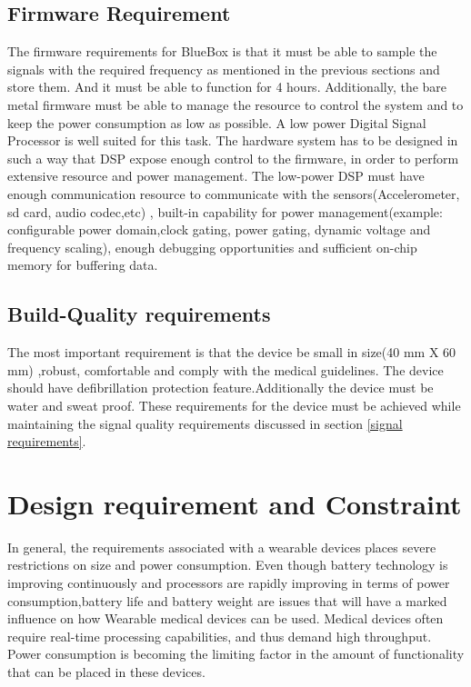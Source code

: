 \subsection{Firmware Requirement }
\hspace{10mm}The firmware requirements for BlueBox  is that it must be able to sample the signals with the required frequency as mentioned in the previous sections and store them. And it must be able to function for 4 hours. Additionally, the bare metal firmware must be able to manage the resource to control the system and to keep the power consumption as low as possible. A low power Digital Signal Processor is well suited for this task. The hardware system has to be designed in such a way that DSP  expose enough control to the firmware, in order to perform extensive resource and power management. The low-power DSP must have enough communication resource to communicate with the sensors(Accelerometer, sd card, audio codec,etc) , built-in capability for power management(example: configurable power domain,clock gating, power gating, dynamic voltage and frequency scaling), enough debugging opportunities and sufficient on-chip memory for buffering data. 

\subsection {Build-Quality requirements} 
\hspace{10mm}The most important requirement is that the device be small in size(40 mm X 60 mm) ,robust, comfortable and comply with the medical guidelines. The device should have defibrillation protection feature.Additionally the device must be water and sweat proof. These requirements for the device must be achieved while maintaining the signal quality requirements discussed in section \ref{signal requirements}.  

\section {Design requirement and Constraint} 
In general, the requirements associated with a wearable devices places severe restrictions on size and power consumption. Even though battery technology is improving continuously and processors are rapidly improving in terms of power consumption,battery life and battery weight are issues that will have a marked influence on how  Wearable medical devices can be used. Medical devices often require real-time processing capabilities, and thus demand high throughput. Power consumption is becoming the limiting factor in the amount of functionality that can be placed in these devices. 

